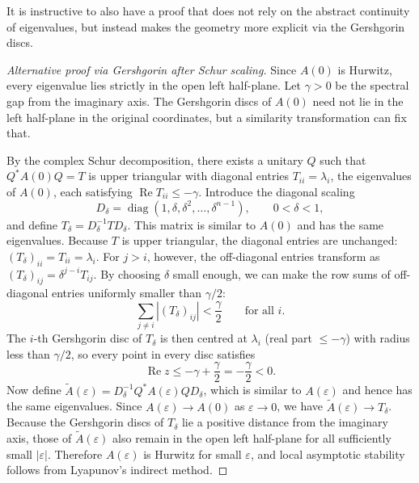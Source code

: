 \documentclass[11pt]{article}
\begin{document}
It is instructive to also have a proof that does not rely on the
abstract continuity of eigenvalues, but instead makes the geometry more
explicit via the Gershgorin discs.

\begin{proof}[Alternative proof via Gershgorin after Schur scaling]
  Since $A(0)$ is Hurwitz, every eigenvalue lies strictly in the open
  left half-plane. Let $\gamma > 0$ be the spectral gap from the
  imaginary axis. The Gershgorin discs of $A(0)$ need not lie in the
  left half-plane in the original coordinates, but a similarity
  transformation can fix that.

  By the complex Schur decomposition, there exists a unitary $Q$ such
  that $Q^*A(0)Q = T$ is upper triangular with diagonal entries
  $T_{ii} = \lambda_i$, the eigenvalues of $A(0)$, each satisfying
  $\operatorname{Re} T_{ii} \leq -\gamma$. Introduce the diagonal
  scaling
  \begin{equation}
    D_\delta
    =
    \operatorname{diag}(1,\delta,\delta^2,\ldots,\delta^{n-1}),
    \qquad
    0<\delta<1,
  \end{equation}
  and define $T_\delta = D_\delta^{-1} T D_\delta$. This matrix is
  similar to $A(0)$ and has the same eigenvalues. Because $T$ is upper
  triangular, the diagonal entries are unchanged: $(T_\delta)_{ii} =
  T_{ii} = \lambda_i$. For $j > i$, however, the off-diagonal entries
  transform as $(T_\delta)_{ij} = \delta^{j-i} T_{ij}$. By choosing
  $\delta$ small enough, we can make the row sums of off-diagonal
  entries uniformly smaller than $\gamma/2$:
  \begin{equation}
    \sum_{j\neq i}|(T_\delta)_{ij}|
    <
    \frac{\gamma}{2}
    \qquad
    \text{for all } i.
  \end{equation}
  The $i$-th Gershgorin disc of $T_\delta$ is then centred at
  $\lambda_i$ (real part $\leq -\gamma$) with radius less than
  $\gamma/2$, so every point in every disc satisfies
  \begin{equation}
    \operatorname{Re}z \leq -\gamma + \frac{\gamma}{2} = -\frac{\gamma}{2} < 0.
  \end{equation}
  Now define $\widetilde A(\varepsilon) = D_\delta^{-1} Q^* A(\varepsilon) Q
  D_\delta$, which is similar to $A(\varepsilon)$ and hence has the same
  eigenvalues. Since $A(\varepsilon) \to A(0)$ as $\varepsilon \to 0$,
  we have $\widetilde A(\varepsilon) \to T_\delta$. Because the
  Gershgorin discs of $T_\delta$ lie a positive distance from the
  imaginary axis, those of $\widetilde A(\varepsilon)$ also remain in
  the open left half-plane for all sufficiently small $|\varepsilon|$.
  Therefore $A(\varepsilon)$ is Hurwitz for small $\varepsilon$, and
  local asymptotic stability follows from Lyapunov's indirect method.
\end{proof}
\end{document}
